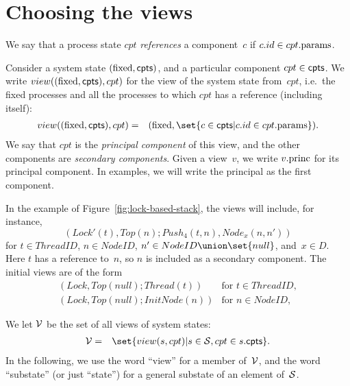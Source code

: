 
\section{Choosing the views}

We say that a process state $cpt$ \emph{references} a component~$c$ if
$c.id \in cpt.\params$. 

Consider a system state $(\fixed, \cpt)$, and a particular component $cpt
\in \cpts$.  We write $view((\fixed, \cpt), cpt)$ for the view of the system
state from~$cpt$, i.e.~the fixed processes and all the processes to which
$cpt$ has a reference (including itself):
%
%
\begin{eqnarray*}
view((\fixed, \cpt), cpt) & = &
  (\fixed, \set{c \in \cpts | c.id \in cpt.\params}).
\end{eqnarray*}
%
We say that $cpt$ is the \emph{principal component} of this view, and the
other components are \emph{secondary components}.  Given a view~$v$, we write
$v.\princ$ for its principal component.  In examples, we will write the
principal as the first component. 

In the example of Figure~\ref{fig:lock-based-stack}, the views will include,
for instance,
\[
(Lock'(t), Top(n); Push_4(t, n), Node_x(n, n'))
\]
for $t \in ThreadID$, $n \in NodeID$, $n' \in NodeID \union \set{null}$,
and~$x \in D$.  Here $t$ has a reference to~$n$, so $n$ is included as a
secondary component.
%
The initial views are of the form
\[
\begin{array}{ll}
(Lock, Top(null); Thread(t)) &  \mbox{for $t \in ThreadID$}, \\
(Lock, Top(null); InitNode(n)) & \mbox{for $n \in NodeID$},
\end{array}
\]

We let $\V$ be the set of all views of system states:
%
\begin{eqnarray*}
\V & = & 
  \set{view(s, cpt) | s \in \S, cpt \in s.\cpt}. %
\end{eqnarray*}
%
In the following, we use the word ``view'' for a member of~$\V$, and the word
``substate'' (or just ``state'') for a general substate of an element of~$\S$.


